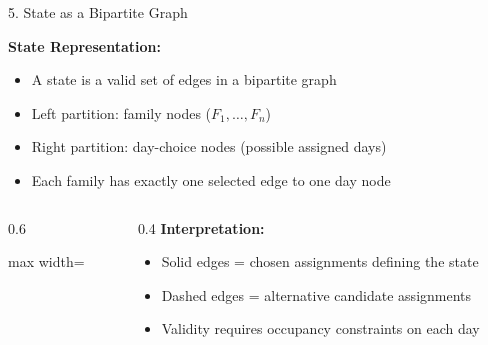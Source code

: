 \documentclass[aspectratio=169]{beamer}
\begin{document}
\begin{frame}{5. State as a Bipartite Graph}

\textbf{State Representation:}
\begin{itemize}
    \item A state is a valid set of edges in a bipartite graph
    \item Left partition: family nodes ($F_1, \ldots, F_n$)
    \item Right partition: day-choice nodes (possible assigned days)
    \item Each family has exactly one selected edge to one day node
\end{itemize}

\begin{columns}[T]

\begin{column}{0.6\textwidth}
\begin{center}
\begin{adjustbox}{max width=\textwidth}
\end{adjustbox}
\end{center}
\end{column}

\begin{column}{0.4\textwidth}
\textbf{Interpretation:}
\begin{itemize}
    \item Solid edges = chosen assignments defining the state
    \item Dashed edges = alternative candidate assignments
    \item Validity requires occupancy constraints on each day
\end{itemize}
\end{column}

\end{columns}

\end{frame}
\end{document}
